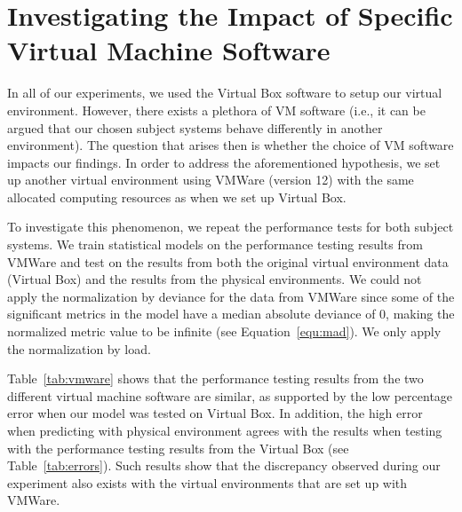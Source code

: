 \section{Investigating the Impact of Specific Virtual Machine Software}

In all of our experiments, we used the Virtual Box software to setup our virtual environment. However, there exists a plethora of VM software (i.e., it can be argued that our chosen subject systems behave differently in another environment). The question that arises then is whether the choice of VM software impacts our findings. In order to address the aforementioned hypothesis, we set up another virtual environment using VMWare (version 12) with the same allocated computing resources as when we set up Virtual Box.

To investigate this phenomenon, we repeat the performance tests for both subject systems. We train statistical models on the performance testing results from VMWare and test on the results from both the original virtual environment data (Virtual Box) and the results from the physical environments. We could not apply the normalization by deviance for the data from VMWare since some of the significant metrics in the model have a median absolute deviance of 0, making the normalized metric value to be infinite (see Equation~\ref{equ:mad}). We only apply the normalization by load. 

Table~\ref{tab:vmware} shows that the performance testing results from the two different virtual machine software are similar, as supported by the low percentage error when our model was tested on Virtual Box. In addition, the high error when predicting with physical environment agrees with the results when testing with the performance testing results from the Virtual Box (see Table~\ref{tab:errors}). Such results show that the discrepancy observed during our experiment also exists with the virtual environments that are set up with VMWare.

\begin{table}[tbh]
	\centering
	\caption{Median absolute percentage error from building a model using VMWare data.}
	\label{tab:vmware}
	\end{table}
	
